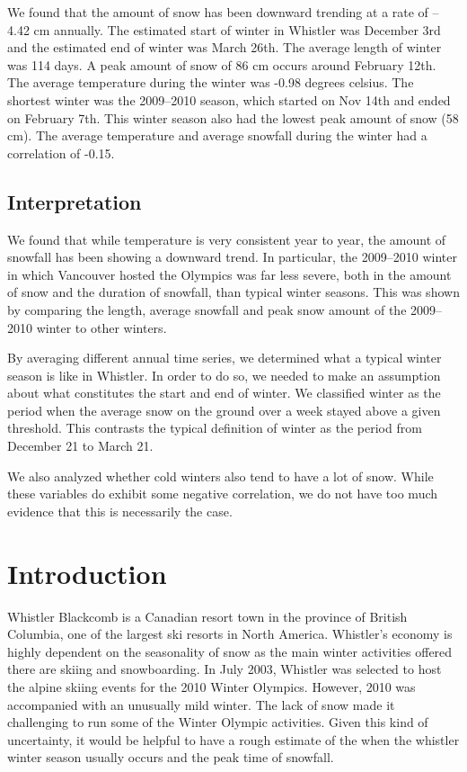 \documentclass[12pt,twoside]{article}
\begin{document}
{We found that the amount of snow has been downward trending at a rate of -- 4.42 cm annually. The estimated start of winter in Whistler was December 3rd and the estimated end of winter was March 26th. The average length of winter was 114 days. A peak amount of snow of 86 cm occurs around February 12th. The average temperature during the winter was -0.98 degrees celsius. The shortest winter was the 2009--2010 season, which started on Nov 14th and ended on February 7th. This winter season also had the lowest peak amount of snow (58 cm). The average temperature and average snowfall during the winter had a correlation of -0.15.

\subsection{Interpretation}

We found that while temperature is very consistent year to year, the amount of snowfall has been showing a downward trend. In particular, the 2009--2010 winter in which Vancouver hosted the Olympics was far less severe, both in the amount of snow and the duration of snowfall, than typical winter seasons. This was shown by comparing the length, average snowfall and peak snow amount of the 2009--2010 winter to other winters.

By averaging different annual time series, we determined what a typical winter season is like in Whistler. In order to do so, we needed to make an assumption about what constitutes the start and end of winter. We classified winter as the period when the average snow on the ground over a week stayed above a given threshold. This contrasts the typical definition of winter as the period from December 21 to March 21.

We also analyzed whether cold winters also tend to have a lot of snow. While these variables do exhibit some negative correlation, we do not have too much evidence that this is necessarily the case.

\section{Introduction}

Whistler Blackcomb is a Canadian resort town in the province of British Columbia, one of the largest ski resorts in North America. Whistler’s economy is highly dependent on the seasonality of snow as the main winter activities offered there are skiing and snowboarding. In July 2003, Whistler was selected to host the alpine skiing events for the 2010 Winter Olympics. However, 2010 was accompanied with an unusually mild winter. The lack of snow made it challenging to run some of the Winter Olympic activities. Given this kind of uncertainty, it would be helpful to have a rough estimate of the when the whistler winter season usually occurs and the peak time of snowfall.

}
\end{document}
